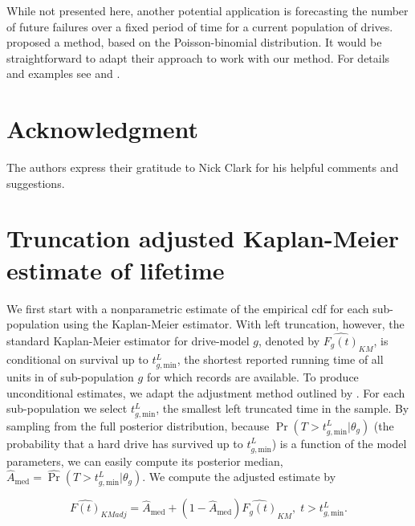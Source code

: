 \documentclass[12pt]{article}
\begin{document}
While not presented here, another potential application is forecasting the number of future failures over a fixed period of time for a current population of drives. \citet{hmm} proposed a method, based on the Poisson-binomial distribution. It would be straightforward to adapt their approach to work with our method. For details and examples see \citet[Sect.~6]{hmm} and \citet{xu2015assessing}.

\section*{Acknowledgment}    
The authors express their gratitude to Nick Clark for his helpful comments and suggestions.

\clearpage

\appendix
\section{Truncation adjusted Kaplan-Meier estimate of lifetime}
\label{sec:trunc-adj}
We first start with a nonparametric estimate of the empirical cdf for each sub-population using the Kaplan-Meier estimator.  With left truncation, however, the standard Kaplan-Meier estimator for drive-model $g$, denoted by
$\widehat{F_g(t)}_{KM}$, is conditional on survival up to
$t_{g,\text{min}}^L$, the shortest reported running time of all units in
of sub-population $g$ for which records are available. To produce
unconditional estimates, we adapt the adjustment method outlined by \citet[Chapter 11]{meeker}.  For each sub-population we select
$t_{g,\text{min}}^L$, the smallest left truncated time in the sample.
By sampling from the full posterior distribution, because
$\Pr(T>t_{g,\text{min}}^L|\theta_g)$ (the probability that a hard drive has
survived up to $t_{g,\text{min}}^L$) is a function of the model
parameters, we can easily compute its posterior median,
$\widehat{A}_{\text{med}} = \widehat{\Pr}(T>t_{g,\text{min}}^L|\theta_g)$. We compute the adjusted estimate by

$$\widehat{F(t)}_{KMadj} = \widehat{A}_{\text{med}} + \left(1 - \widehat{A}_{\text{med}}\right)\widehat{F_g(t)}_{KM},\; t>t_{g,\text{min}}^L.$$
\end{document}
